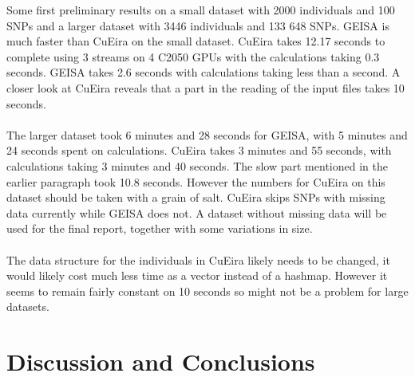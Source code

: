 \documentclass[10pt,a4paper]{report}
\begin{document}
Some first preliminary results on a small dataset with 2000 individuals and 100 SNPs and a larger dataset with 3446 individuals and 133 648 SNPs. GEISA is much faster than CuEira on the small dataset. CuEira takes 12.17 seconds to complete using 3 streams on 4 C2050 GPUs with the calculations taking 0.3 seconds. GEISA takes 2.6 seconds with calculations taking less than a second. A closer look at CuEira reveals that a part in the reading of the input files takes 10 seconds.\\
\\
The larger dataset took 6 minutes and 28 seconds for GEISA, with 5 minutes and 24 seconds spent on calculations. CuEira takes 3 minutes and 55 seconds, with calculations taking 3 minutes and 40 seconds. The slow part mentioned in the earlier paragraph took 10.8 seconds. However the numbers for CuEira on this dataset should be taken with a grain of salt. CuEira skips SNPs with missing data currently while GEISA does not. A dataset without missing data will be used for the final report, together with some variations in size.\\
\\
The data structure for the individuals in CuEira likely needs to be changed, it would likely cost much less time as a vector instead of a hashmap. However it seems to remain fairly constant on 10 seconds so might not be a problem for large datasets.

\chapter{Discussion and Conclusions}



\end{document}
